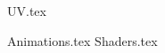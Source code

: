 \documentclass[12pt]{article} %
\begin{document}
{UV.tex} 

{Animations.tex} 
{Shaders.tex} 
\end{document}
